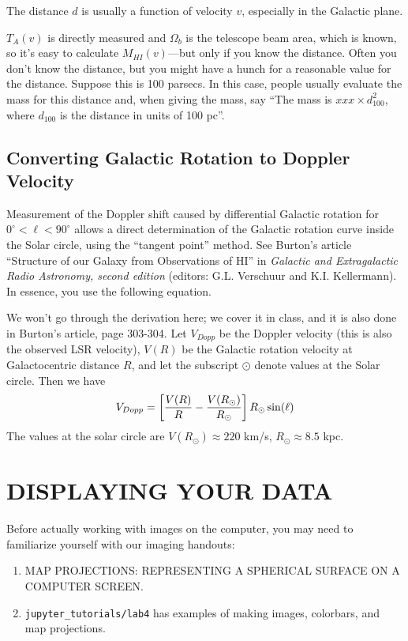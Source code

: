 \documentclass[psfig,preprint]{aastex}
\begin{document}
\noindent The distance $d$ is usually a function of velocity $v$,
especially in the Galactic plane. 

	$T_A(v)$ is directly measured and $\Omega_b$ is the telescope
beam area, which is known, so it's easy to calculate $M_{HI}(v)$---but
only if you know the distance. Often you don't know the distance, but
you might have a hunch for a reasonable value for the distance. Suppose
this is 100 parsecs. In this case, people usually evaluate the mass for
this distance and, when giving the mass, say ``The mass is $xxx \times
d_{100}^2$, where $d_{100}$ is the distance in units of 100 pc''.

\subsection{Converting Galactic Rotation to Doppler Velocity}

          Measurement of the Doppler shift caused by differential
Galactic rotation for $0^\circ < \ell < 90^\circ$ allows a direct
determination of the Galactic rotation curve inside the Solar circle,
using the ``tangent point'' method. See Burton's article ``Structure
of our Galaxy from Observations of HI'' in {\it Galactic and
Extragalactic Radio Astronomy, second edition} (editors: G.L. Verschuur
and K.I. Kellermann). In essence, you use the following equation.

	We won't go through the derivation here; we cover it in class,
and it is also done in Burton's article,
page 303-304.  Let $V_{Dopp}$ be the Doppler velocity (this is also the
observed LSR velocity), $V(R)$ be the Galactic rotation velocity at
Galactocentric distance $R$, and let the subscript $\odot$ denote values
at the Solar circle.  Then we have
\begin{equation} \label{vdopp}
V_{Dopp} = \left[ {V(R) \over R} - {V(R_\odot) \over R_\odot}\right]
R_\odot \sin(\ell)
\end{equation}
\noindent The values at the solar circle are $V(R_\odot) \approx 220$
km/s, $R_\odot \approx 8.5$ kpc.

\section{DISPLAYING YOUR DATA} \label{datadisplay}

Before actually working with images on the computer, you may need to
familiarize yourself with our imaging handouts:
\begin{enumerate}

\item MAP PROJECTIONS: REPRESENTING A SPHERICAL SURFACE ON A COMPUTER
  SCREEN.

\item {\tt jupyter\_tutorials/lab4} has examples of making images, colorbars, and map projections.
\end{enumerate}
\end{document}
